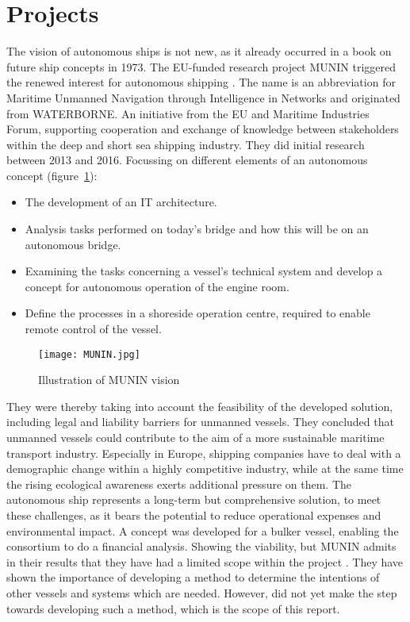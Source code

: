 \section{Projects}
The vision of autonomous ships is not new, as it already occurred in a book on future ship concepts in 1973. The EU-funded research project MUNIN triggered the renewed interest for autonomous shipping \cite{Saarni2018}. The name is an abbreviation for Maritime Unmanned Navigation through Intelligence in Networks and originated from WATERBORNE. An initiative from the EU and Maritime Industries Forum, supporting cooperation and exchange of knowledge between stakeholders within the deep and short sea shipping industry. They did initial research between 2013 and 2016. Focussing on different elements of an autonomous concept (figure~\ref{fig:MUNIN}): 
\begin{itemize}
	\item The development of an IT architecture. 
	\item Analysis tasks performed on today's bridge and how this will be on an autonomous bridge. 
	\item Examining the tasks concerning a vessel’s technical system and develop a concept for autonomous operation of the engine room. 
	\item Define the processes in a shoreside operation centre, required to enable remote control of the vessel. 
\end{itemize}

\begin{figure}[hbp]
	\centering
	\texttt{[image: MUNIN.jpg]}
	\caption{Illustration of MUNIN vision}
	\label{fig:MUNIN}
\end{figure}

They were thereby taking into account the feasibility of the developed solution, including legal and liability barriers for unmanned vessels.
They concluded that unmanned vessels could contribute to the aim of a more sustainable maritime transport industry. Especially in Europe, shipping companies have to deal with a demographic change within a highly competitive industry, while at the same time the rising ecological awareness exerts additional pressure on them. The autonomous ship represents a long-term but comprehensive solution, to meet these challenges, as it bears the potential to reduce operational expenses and environmental impact.
A concept was developed for a bulker vessel, enabling the consortium to do a financial analysis. Showing the viability, but MUNIN admits in their results that they have had a limited scope within the project \cite{MUNIN2016}. They have shown the importance of developing a method to determine the intentions of other vessels and systems which are needed. However, did not yet make the step towards developing such a method, which is the scope of this report.

